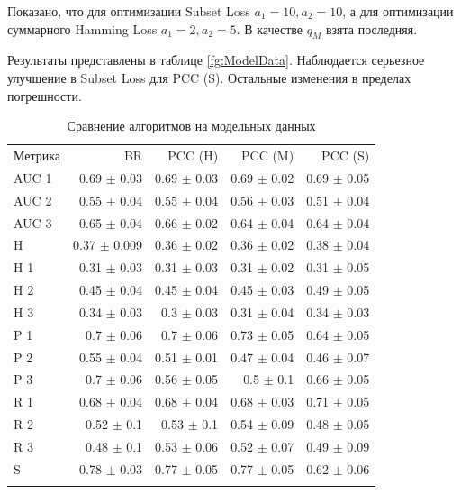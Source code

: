 \documentclass[12pt,twoside]{article}
\begin{document}
Показано, что для оптимизации Subset Loss $a_1=10,a_2=10$, а для оптимизации суммарного Hamming Loss $a_1=2, a_2=5$. В качестве $q_M$ взята последняя.

Результаты представлены в таблице \ref{fg:ModelData}. Наблюдается серьезное улучшение в Subset Loss для PCC (S). Остальные изменения в пределах погрешности.

\begin{table}[H]%
	\caption{Сравнение алгоритмов на модельных данных}
	\label{t:modelData}
	\centering\medskip%
	\begin{tabular}{lrrrr}
		\headline
		Метрика &             BR &         PCC (H) &         PCC (M) &         PCC (S) \\
		\headline
		AUC 1 &   0.69 $\pm$ 0.03 &  0.69 $\pm$ 0.03 &  0.69 $\pm$ 0.02 &  0.69 $\pm$ 0.05 \\
		AUC 2 &   0.55 $\pm$ 0.04 &  0.55 $\pm$ 0.04 &  0.56 $\pm$ 0.03 &  0.51 $\pm$ 0.04 \\
		AUC 3 &   0.65 $\pm$ 0.04 &  0.66 $\pm$ 0.02 &  0.64 $\pm$ 0.04 &  0.64 $\pm$ 0.04 \\
		H     &  0.37 $\pm$ 0.009 &  0.36 $\pm$ 0.02 &  0.36 $\pm$ 0.02 &  0.38 $\pm$ 0.04 \\
		H 1   &   0.31 $\pm$ 0.03 &  0.31 $\pm$ 0.03 &  0.31 $\pm$ 0.02 &  0.31 $\pm$ 0.05 \\
		H 2   &   0.45 $\pm$ 0.04 &  0.45 $\pm$ 0.04 &  0.45 $\pm$ 0.03 &  0.49 $\pm$ 0.05 \\
		H 3   &   0.34 $\pm$ 0.03 &   0.3 $\pm$ 0.03 &  0.31 $\pm$ 0.04 &  0.34 $\pm$ 0.03 \\
		P 1   &    0.7 $\pm$ 0.06 &   0.7 $\pm$ 0.06 &  0.73 $\pm$ 0.05 &  0.64 $\pm$ 0.05 \\
		P 2   &   0.55 $\pm$ 0.04 &  0.51 $\pm$ 0.01 &  0.47 $\pm$ 0.04 &  0.46 $\pm$ 0.07 \\
		P 3   &    0.7 $\pm$ 0.06 &  0.56 $\pm$ 0.05 &    0.5 $\pm$ 0.1 &  0.66 $\pm$ 0.05 \\
		R 1   &   0.68 $\pm$ 0.04 &  0.68 $\pm$ 0.04 &  0.68 $\pm$ 0.03 &  0.71 $\pm$ 0.05 \\
		R 2   &    0.52 $\pm$ 0.1 &   0.53 $\pm$ 0.1 &  0.54 $\pm$ 0.09 &  0.48 $\pm$ 0.05 \\
		R 3   &    0.48 $\pm$ 0.1 &  0.53 $\pm$ 0.06 &  0.52 $\pm$ 0.07 &  0.49 $\pm$ 0.09 \\
		S     &   0.78 $\pm$ 0.03 &  0.77 $\pm$ 0.05 &  0.77 $\pm$ 0.05 &  0.62 $\pm$ 0.06 \\
		\headline
	\end{tabular}
\end{table}
\end{document}
